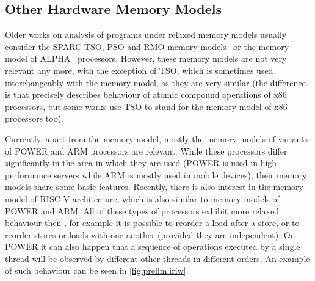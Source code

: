 \subsection{Other Hardware Memory Models}


Older works on analysis of programs under relaxed memory models usually
consider the SPARC TSO, PSO and RMO memory models~ or the memory
model of ALPHA~ processors.
However, these memory models are not very relevant any more, with the exception
of TSO, which is sometimes used interchangeably with the \xtso memory model, as
they are very similar (the difference is that \xtso precisely describes
behaviour of atomic compound operations of x86 processors, but some works use
TSO to stand for the memory model of x86 processors too).

Currently, apart from the \xtso memory model, mostly the memory models of
variants of POWER and ARM processors are relevant.
While these processors differ significantly in the area in which they are used
(POWER is used in high-performance servers while ARM is mostly used in mobile
devices), their memory models share some basic features.
Recently, there is also interest in the memory model of RISC-V architecture, which is also similar to memory models of POWER and ARM.
All of these types of processors exhibit more relaxed behaviour then \xtso,
for example it is possible to reorder a load after a store, or to reorder
stores or loads with one another (provided they are independent).
On POWER it can also happen that a sequence of operations executed by a single thread will be observed by different other threads in different orders.
An example of such behaviour can be seen in \autoref{fig:prelim:iriw}.

